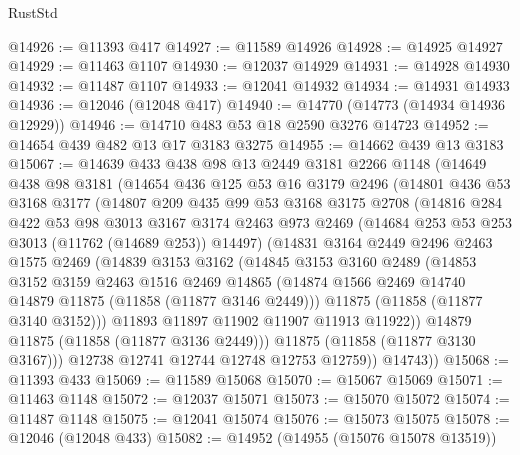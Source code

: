 \begin{lexlean}{RustStd}
\begin{coremodule}
@14926 := @11393 @417
@14927 := @11589 @14926
@14928 := @14925 @14927
@14929 := @11463 @1107
@14930 := @12037 @14929
@14931 := @14928 @14930
@14932 := @11487 @1107
@14933 := @12041 @14932
@14934 := @14931 @14933
@14936 := @12046 (@12048 @417)
@14940 := @14770 (@14773 (@14934 @14936 @12929))
@14946 := @14710 @483 @53 @18 @2590 @3276 @14723
@14952 := @14654 @439 @482 @13 @17 @3183 @3275
@14955 := @14662 @439 @13 @3183
@15067 := @14639
    @433
    @438
    @98
    @13
    @2449
    @3181
    @2266
    @1148
    (@14649
      @438
      @98
      @3181
      (@14654
        @436
        @125
        @53
        @16
        @3179
        @2496
        (@14801
          @436
          @53
          @3168
          @3177
          (@14807
            @209
            @435
            @99
            @53
            @3168
            @3175
            @2708
            (@14816
              @284
              @422
              @53
              @98
              @3013
              @3167
              @3174
              @2463
              @973
              @2469
              (@14684 @253 @53 @253 @3013 (@11762 (@14689 @253)) @14497)
              (@14831
                @3164
                @2449
                @2496
                @2463
                @1575
                @2469
                (@14839
                  @3153
                  @3162
                  (@14845
                    @3153
                    @3160
                    @2489
                    (@14853
                      @3152
                      @3159
                      @2463
                      @1516
                      @2469
                      @14865
                      (@14874 @1566 @2469 @14740 @14879 @11875 (@11858 (@11877 @3146 @2449)))
                      @11875
                      (@11858 (@11877 @3140 @3152)))
                    @11893
                    @11897
                    @11902
                    @11907
                    @11913
                    @11922))
                @14879
                @11875
                (@11858 (@11877 @3136 @2449)))
              @11875
              (@11858 (@11877 @3130 @3167)))
            @12738
            @12741
            @12744
            @12748
            @12753
            @12759))
        @14743))
@15068 := @11393 @433
@15069 := @11589 @15068
@15070 := @15067 @15069
@15071 := @11463 @1148
@15072 := @12037 @15071
@15073 := @15070 @15072
@15074 := @11487 @1148
@15075 := @12041 @15074
@15076 := @15073 @15075
@15078 := @12046 (@12048 @433)
@15082 := @14952 (@14955 (@15076 @15078 @13519))

\end{coremodule}
\end{lexlean}
